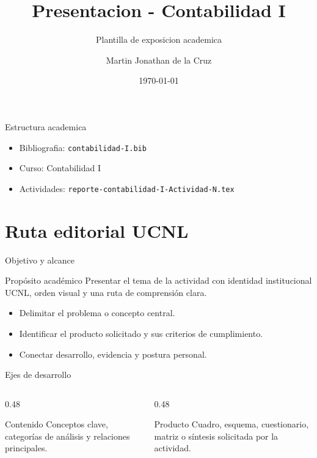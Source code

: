 ﻿\documentclass[spanish,aspectratio=169]{beamer}
\title{Presentacion - Contabilidad I}
\subtitle{Plantilla de exposicion academica}
\author{Martin Jonathan de la Cruz}
\institute{Universidad Ciudadana de Nuevo Leon}
\date{\today}
\begin{document}
\begin{frame}
  \titlepage
\end{frame}

\begin{frame}{Estructura academica}
  \begin{itemize}
    \item Bibliografia: \texttt{contabilidad-I.bib}
    \item Curso: Contabilidad I
    \item Actividades: \texttt{reporte-contabilidad-I-Actividad-N.tex}
  \end{itemize}
\end{frame}


\section{Ruta editorial UCNL}

\begin{frame}{Objetivo y alcance}
  \begin{block}{Propósito académico}
    Presentar el tema de la actividad con identidad institucional UCNL, orden visual y una ruta de comprensión clara.
  \end{block}
  \begin{itemize}
    \item Delimitar el problema o concepto central.
    \item Identificar el producto solicitado y sus criterios de cumplimiento.
    \item Conectar desarrollo, evidencia y postura personal.
  \end{itemize}
\end{frame}

\begin{frame}{Ejes de desarrollo}
  \begin{columns}[T,totalwidth=\textwidth]
    \begin{column}{0.48\textwidth}
      \begin{block}{Contenido}
        Conceptos clave, categorías de análisis y relaciones principales.
      \end{block}
    \end{column}
    \begin{column}{0.48\textwidth}
      \begin{block}{Producto}
        Cuadro, esquema, cuestionario, matriz o síntesis solicitada por la actividad.
      \end{block}
    \end{column}
  \end{columns}
\end{frame}
\end{document}
